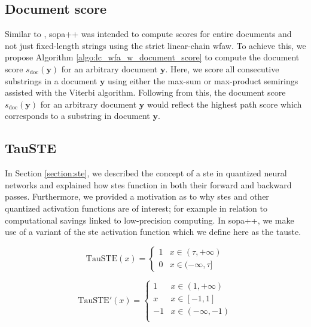 \subsection{Document score}

Similar to \citet{schwartz2018sopa}, \ac{sopa}++ was intended to compute scores for
entire documents and not just fixed-length strings using the strict linear-chain
\ac{wfaw}. To achieve this, we propose Algorithm
\ref{algo:lc_wfa_w_document_score} to compute the document score
$s_{\text{doc}}(\bm{y})$ for an arbitrary document $\bm{y}$. Here, we score all
consecutive substrings in a document $\bm{y}$ using either the max-sum or
max-product semirings assisted with the Viterbi algorithm. Following from this,
the document score $s_{\text{doc}}(\bm{y})$ for an arbitrary document $\bm{y}$
would reflect the highest path score which corresponds to a substring in
document $\bm{y}$.

\subsection{TauSTE}

In Section \ref{section:ste}, we described the concept of a \ac{ste} in quantized
neural networks and explained how \ac{ste}s function in both their forward and
backward passes. Furthermore, we provided a motivation as to why \ac{ste}s and other
quantized activation functions are of interest; for example in relation to
computational savings linked to low-precision computing. In \ac{sopa}++, we make use
of a variant of the \ac{ste} activation function which we define here as the \ac{tauste}.

\begin{equation}
  \label{eq:tau_ste_forward}
  \text{TauSTE}(x)=
  \begin{cases}
    1 & x \in (\tau, +\infty) \\
    0 & x \in (-\infty, \tau]
  \end{cases}
\end{equation}

\begin{equation}
  \label{eq:tau_ste_backward}
  \text{TauSTE}'(x)=
  \begin{cases}
    1 & x \in  (1, +\infty) \\
    x & x \in [-1, 1] \\
    -1 & x \in (-\infty, -1) \\
  \end{cases}
\end{equation}

